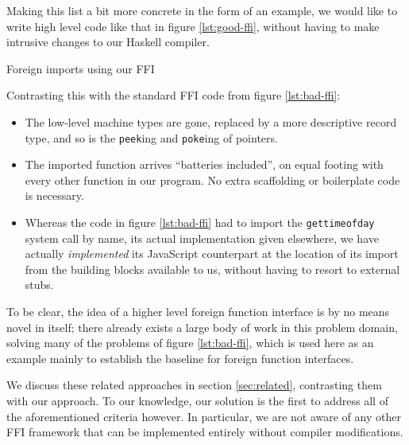\documentclass[preprint]{sigplanconf}
\begin{document}
Making this list a bit more concrete in the form of an example, we would like
to write high level code like that in figure \ref{lst:good-ffi}, without
having to make intrusive changes to our Haskell compiler.

\begin{listingfloat}
\caption{Foreign imports using our FFI}
\label{lst:good-ffi}
\end{listingfloat}

Contrasting this with the standard FFI code from figure \ref{lst:bad-ffi}:

\begin{itemize}
\item
  The low-level machine types are gone, replaced by a more descriptive record
  type, and so is the \lstinline!peek!ing and \lstinline!poke!ing of pointers.
\item
  The imported function arrives ``batteries included'', on equal footing with
  every other function in our program. No extra scaffolding or boilerplate
  code is necessary.
\item
  Whereas the code in figure \ref{lst:bad-ffi} had to import the
  \lstinline!gettimeofday! system call by name, its actual implementation
  given elsewhere, we have actually \emph{implemented} its JavaScript
  counterpart at the location of its import from the building blocks
  available to us, without having to resort to external stubs.
\end{itemize}

To be clear, the idea of a higher level foreign function interface is by no
means novel in itself;
there already exists a large body of work in this problem domain, solving many
of the problems of figure \ref{lst:bad-ffi},
which is used here as an example mainly to
establish the baseline for foreign function interfaces.

We discuss these related approaches in section \ref{sec:related}, contrasting
them with our approach. To our knowledge, our solution is the first to address
all of the aforementioned criteria however.
In particular, we are not aware of any other FFI framework that can be
implemented entirely without compiler modifications.
\end{document}
